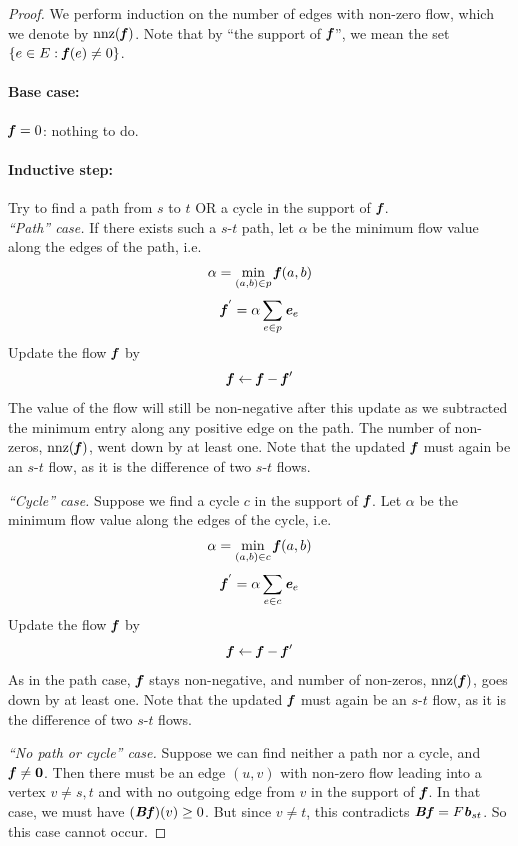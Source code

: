 \begin{proof}
We perform induction on the number of edges with non-zero flow, which
we denote by $\operatorname{nnz}(\boldsymbol{\mathit{f}})$.
Note that by ``the support of $\boldsymbol{\mathit{f}}$'', we mean the set $\left\{e \in E :
  \boldsymbol{\mathit{f}}(e) \neq 0 \right\}$.
\paragraph{Base case:}  \(\boldsymbol{\mathit{f}} = 0\): nothing to do.
\paragraph{Inductive step:}
Try to find a path from \(s\) to \(t\) OR a cycle in the support of \(\boldsymbol{\mathit{f}}\). \\
\emph{``Path'' case.}
If there exists such a $s$-$t$ path, let \(\alpha\) be the minimum flow value along the edges of the path, i.e.
\begin{equation} \nonumber
\begin{aligned}
\alpha = \min_{(a,b) \in p} \boldsymbol{\mathit{f}}(a,b)
\end{aligned}
\end{equation}
\begin{equation} \nonumber
    \boldsymbol{\mathit{f}}^{'} = \alpha \sum_{e \in p} \boldsymbol{\mathit{e}}_e
\end{equation}
Update the flow $\boldsymbol{\mathit{f}}$ by
\begin{equation} \nonumber
    \boldsymbol{\mathit{f}}  \leftarrow \boldsymbol{\mathit{f}} - \boldsymbol{\mathit{f}}'
\end{equation}
The value of the flow will still be non-negative after this update as we
subtracted the minimum entry along any positive edge on the path. The
number of non-zeros, $\operatorname{nnz}(\boldsymbol{\mathit{f}})$, went down by at least one.
Note that the updated $\boldsymbol{\mathit{f}}$ must again be an $s$-$t$ flow, as it is the
difference of two $s$-$t$ flows.

\emph{``Cycle'' case.}
Suppose we find a cycle \(c\) in the support of \(\boldsymbol{\mathit{f}}\).
Let \(\alpha\) be the minimum flow value along the edges of the cycle, i.e.\
\begin{equation*}
\alpha = \min_{(a,b) \in c} \boldsymbol{\mathit{f}}(a,b)
\end{equation*}
\begin{equation*}
 \boldsymbol{\mathit{f}}^{'} = \alpha \sum_{e \in c} \boldsymbol{\mathit{e}}_e
\end{equation*}
Update the flow $\boldsymbol{\mathit{f}}$ by
\begin{equation} \nonumber
    \boldsymbol{\mathit{f}}  \leftarrow \boldsymbol{\mathit{f}} - \boldsymbol{\mathit{f}}'
  \end{equation}
  As in the path case, $\boldsymbol{\mathit{f}}$ stays non-negative, and
number of non-zeros, $\operatorname{nnz}(\boldsymbol{\mathit{f}})$, goes down by at least one.
Note that the updated $\boldsymbol{\mathit{f}}$ must again be an $s$-$t$ flow, as it is the
difference of two $s$-$t$ flows.

\emph{``No path or cycle'' case.}
Suppose we can find neither a path nor a cycle, and $\boldsymbol{\mathit{f}} \neq
\boldsymbol{0}$.
Then there must be an edge $(u,v)$ with non-zero flow leading into a
vertex $v \neq s,t$ and with no outgoing edge from
$v$ in the support of $\boldsymbol{\mathit{f}}$.
In that case, we must have $(\boldsymbol{\mathit{B}}\boldsymbol{\mathit{f}})(v) \geq 0$.
But since $v \neq t$, this contradicts $\boldsymbol{\mathit{B}} \boldsymbol{\mathit{f}} = F \boldsymbol{\mathit{b}}_{st} $.
So this case cannot occur.
\end{proof}

